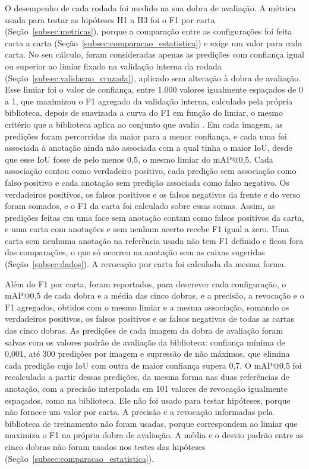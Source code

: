 \documentclass[
    12pt,                %
    openright,           %
    oneside,             %
    a4paper,             %
    english,             %
    brazil               %
]{abntex2}
\begin{document}
O desempenho de cada rodada foi medido na sua dobra de avaliação. A
métrica usada para testar as hipóteses H1 a H3 foi o F1 por carta
(Seção~\ref{subsec:metricas}), porque a comparação entre as
configurações foi feita carta a carta
(Seção~\ref{subsec:comparacao_estatistica}) e exige um valor para cada
carta. No seu cálculo, foram consideradas apenas as predições com
confiança igual ou superior ao limiar fixado na validação interna da
rodada (Seção~\ref{subsec:validacao_cruzada}), aplicado sem alteração
à dobra de avaliação. Esse limiar foi o valor de confiança, entre 1.000
valores igualmente espaçados de 0 a 1, que maximizou o F1 agregado da validação interna, calculado pela própria biblioteca, depois de suavizada a curva do F1 em função do
limiar, o mesmo critério que a biblioteca aplica ao conjunto que avalia
\cite{Jocher2023}. Em cada imagem, as predições foram percorridas da
maior para a menor confiança, e cada uma foi associada à anotação ainda
não associada com a qual tinha o maior IoU, desde que esse IoU fosse de
pelo menos 0,5, o mesmo limiar do mAP@0,5. Cada associação contou como
verdadeiro positivo, cada predição sem associação como falso positivo e
cada anotação sem predição associada como falso negativo. Os
verdadeiros positivos, os falsos positivos e os falsos negativos da
frente e do verso foram somados, e o F1 da carta foi calculado sobre
essas somas. Assim, as predições feitas em uma face sem anotação contam
como falsos positivos da carta, e uma carta com anotações e sem nenhum
acerto recebe F1 igual a zero. Uma carta sem nenhuma anotação na
referência usada não tem F1 definido e ficou fora das comparações, o
que só ocorreu na anotação sem as caixas sugeridas
(Seção~\ref{subsec:dados}). A revocação por carta foi calculada da
mesma forma.

Além do F1 por carta, foram reportados, para descrever cada
configuração, o mAP@0,5 de cada dobra e a média das cinco dobras, e a
precisão, a revocação e o F1 agregados, obtidos com o mesmo limiar e a
mesma associação, somando os verdadeiros positivos, os falsos positivos
e os falsos negativos de todas as cartas das cinco dobras. As predições
de cada imagem da dobra de avaliação foram salvas com os valores padrão
de avaliação da biblioteca: confiança mínima de 0,001, até 300
predições por imagem e supressão de não máximos, que elimina cada
predição cujo IoU com outra de maior confiança supera 0,7. O mAP@0,5
foi recalculado a partir dessas predições, da mesma forma nas duas
referências de anotação, com a precisão interpolada em 101 valores de
revocação igualmente espaçados, como na biblioteca. Ele não foi usado
para testar hipóteses, porque não fornece um valor por carta. A precisão e a revocação informadas
pela biblioteca de treinamento não foram usadas, porque correspondem ao
limiar que maximiza o F1 na própria dobra de avaliação. A média e o
desvio padrão entre as cinco dobras não foram usados nos testes das
hipóteses (Seção~\ref{subsec:comparacao_estatistica}).
\end{document}
